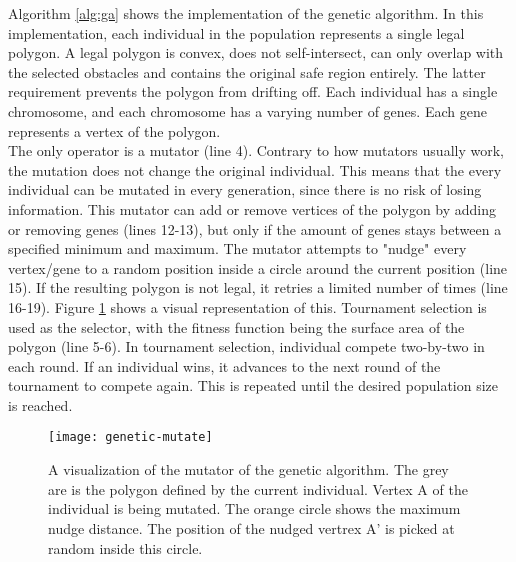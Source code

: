 Algorithm \ref{alg:ga} shows the implementation of the genetic algorithm. In this implementation, each individual in the population represents a single legal polygon. A legal polygon is convex, does not self-intersect, can only overlap with the selected obstacles and contains the original safe region entirely. The latter requirement prevents the polygon from drifting off. Each individual has a single chromosome, and each chromosome has a varying number of genes. Each gene represents a vertex of the polygon.\\
The only operator is a mutator (line 4). Contrary to how mutators usually work, the mutation does not change the original individual. This means that the every individual can be mutated in every generation, since there is no risk of losing information. This mutator can add or remove vertices of the polygon by adding or removing genes (lines 12-13), but only if the amount of genes stays between a specified minimum and maximum. The mutator attempts to "nudge" every vertex/gene to a random position inside a circle around the current position (line 15). If the resulting polygon is not legal, it retries a limited number of times (line 16-19). Figure \ref{fig:genetic-mutate} shows a visual representation of this.
Tournament selection is used as the selector, with the fitness function being the surface area of the polygon (line 5-6). In tournament selection, individual compete two-by-two in each round. If an individual wins, it advances to the next round of the tournament to compete again. This is repeated until the desired population size is reached.

\begin{figure}
\centering
\texttt{[image: genetic-mutate]}
\caption[A visualization of the mutator of the genetic algorithm]{A visualization of the mutator of the genetic algorithm. The grey are is the polygon defined by the current individual. Vertex A of the individual is being mutated. The orange circle shows the maximum nudge distance. The position of the nudged vertrex A' is picked at random inside this circle.}
\label{fig:genetic-mutate}
\end{figure}